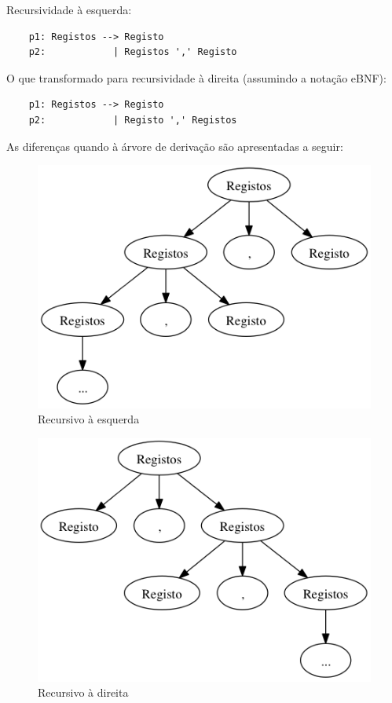 \documentclass[a4paper,11pt,openright,openbib]{article}
\begin{document}
Recursividade à esquerda:
\begin{verbatim}
	p1: Registos --> Registo
	p2:            | Registos ',' Registo
\end{verbatim}

O que transformado para recursividade à direita (assumindo a notação eBNF):

\begin{verbatim}
	p1: Registos --> Registo
	p2:            | Registo ',' Registos
\end{verbatim}

As diferenças quando à árvore de derivação são apresentadas a seguir:

\begin{figure}[!htb]
	\begin{center}
		\includegraphics[scale=.5]{../ficha5/lr.png}
	\end{center}	
	\caption{\label{lrec}Recursivo à esquerda}
\end{figure}

\begin{figure}[!htb]
	\begin{center}
		\includegraphics[scale=.5]{../ficha5/rr.png}
	\end{center}	
	\caption{\label{lrec}Recursivo à direita}
\end{figure}
\end{document}
